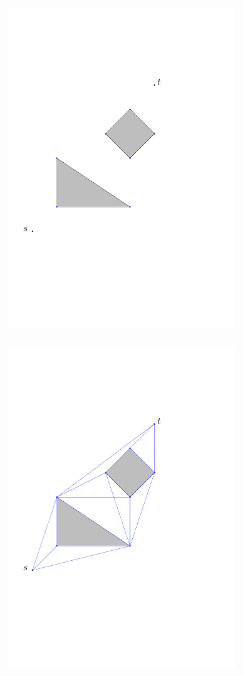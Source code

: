 \begin{figure}[H]
	\caption{Example of visibility graph}
	\begin{subfigure}{.5\textwidth}
		\includegraphics[width=6cm]{figures/visibilitygraph1.pdf}
		\caption{}
	\label{fig:visibilitygraph1}
	\end{subfigure}
	\begin{subfigure}{.5\textwidth}
		\includegraphics[width=6cm]{figures/visibilitygraph.pdf}
		\caption{}
		\label{fig:visibilitygraph1}
	\end{subfigure}
	\label{visibilitygraph}
\end{figure}
